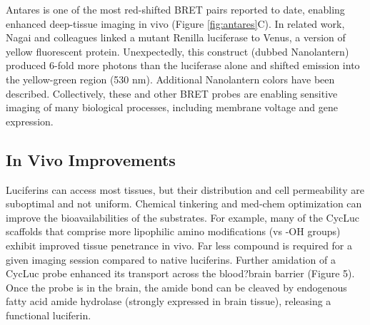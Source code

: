 Antares is one of the most red-shifted BRET
pairs reported to date, enabling enhanced deep-tissue imaging
in vivo (Figure \ref{fig:antares}C). In related work, Nagai and colleagues
linked a mutant Renilla luciferase to Venus, a version of yellow
fluorescent protein.\cite{Saito:2012gs} Unexpectedly, this construct (dubbed
Nanolantern) produced 6-fold more photons than the
luciferase alone and shifted emission into the yellow-green
region (530 nm). Additional Nanolantern colors have been
described.\cite{Suzuki:2016jw} Collectively, these and other BRET probes are
enabling sensitive imaging of many biological processes,
including membrane voltage\cite{Inagaki:2017kj} and gene expression.\cite{Horikiri:2017bt}
\subsection*{In Vivo Improvements}
Luciferins can access most tissues, but their distribution and cell permeability are suboptimal and
not uniform.\cite{RN101} Chemical tinkering and med-chem optimization
can improve the bioavailabilities of the substrates. For example,
many of the CycLuc scaffolds that comprise more lipophilic
amino modifications (vs -OH groups) exhibit improved tissue
penetrance in vivo.\cite{RN98} Far less compound is required for a given
imaging session compared to native luciferins. Further
amidation of a CycLuc probe enhanced its transport across
the blood?brain barrier (Figure 5).\cite{Mofford:2015br} Once the probe is in the
brain, the amide bond can be cleaved by endogenous fatty acid
amide hydrolase (strongly expressed in brain tissue), releasing a
functional luciferin.
